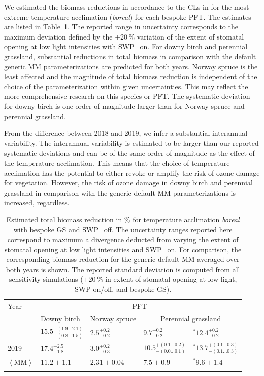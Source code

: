 \documentclass[bg, manuscript]{copernicus}
\begin{document}
We estimated the biomass reductions in accordance to the CLs in \citet{ICP:MappingManual2017, ESPR:Hayes2021} for the most extreme temperature acclimation (\emph{boreal}) for each bespoke PFT. The estimates are listed in Table~\ref{tab:biomass_reduction}. The reported range in uncertainty corresponds to the maximum deviation defined by the $\pm 20\,\unit{\%}$ variation of the extent of stomatal opening at low light intensities with SWP=on. For downy birch and perennial grassland, substantial reductions in total biomass in comparison with the default generic MM parameterizations are predicted for both years. Norway spruce is the least affected and the magnitude of total biomass reduction is independent of the choice of the parameterization within given uncertainties. This may reflect the more comprehensive research on this species or PFT. The systematic deviation for downy birch is one order of magnitude larger than for Norway spruce and perennial grassland.

From the difference between 2018 and 2019, we infer a substantial interannual variability. The interannual variability is estimated to be larger than our reported systematic deviations and can be of the same order of magnitude as the effect of the temperature acclimation. This means that the choice of temperature acclimation has the potential to either revoke or amplify the risk of ozone damage for vegetation. However, the risk of ozone damage in downy birch and perennial grassland in comparison with the generic default MM parameterizations is increased, regardless.

\begin{table}[t]
  \caption{Estimated total biomass reduction in \unit{\%} for temperature acclimation \emph{boreal} with bespoke GS and SWP=off. The uncertainty ranges reported here correspond to maximum a divergence deducted from varying the extent of stomatal opening at low light intensities and SWP=on. For comparison, the corresponding biomass reduction for the generic default MM averaged over both years is shown. The reported standard deviation is computed from all sensitivity simulations ($\pm 20\,\unit{\%}$ in extent of stomatal opening at low light, SWP on/off, and bespoke GS).}
  \label{tab:biomass_reduction}
\begin{tabular}{lllll}
\tophline
Year & \multicolumn{4}{c}{PFT}\\
& Downy birch & Norway spruce & \multicolumn{2}{c}{Perennial grassland}\\
\middlehline
2018 & $15.5^{+(1.9...2.1)}_{-(0.8...1.5)}$ & $2.5^{+0.2}_{-0.2}$ & $9.7^{+0.2}_{-0.2}$ & $^*12.4^{+0.2}_{-0.2}$\\
2019 & $17.4^{+2.5}_{-1.8}$ & $3.0^{+0.2}_{-0.3}$ & $10.5^{+(0.1...0.2)}_{-(0.0...0.1)}$ & $^*13.7^{+(0.1...0.3)}_{-(0.1...0.3)}$\\
\middlehline
$\left<\mathrm{MM}\right>$ & $11.2\pm 1.1$ & $2.31\pm 0.04$ & $7.5\pm 0.9$ & $^*9.6\pm 1.4$\\
\bottomhline
\end{tabular}
\end{table}
\end{document}
